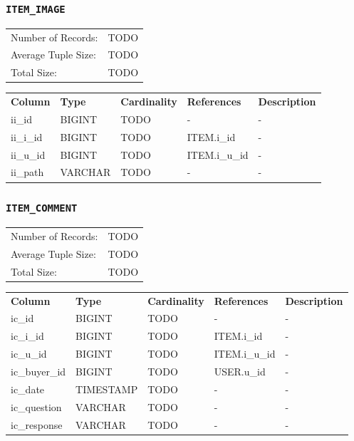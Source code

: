 \documentclass[a4paper,10pt]{article}
\begin{document}
\subsubsection{\texttt{ITEM\_IMAGE}}

\begin{tabular}{ll}
Number of Records:      & TODO \\
Average Tuple Size:     & TODO \\
Total Size:             & TODO \\
\end{tabular}

\vspace*{0.1in}

\noindent \begin{tabular*}{\textwidth}{@{\extracolsep{\fill}} lllll}
\textbf{Column} & \textbf{Type} & \textbf{Cardinality} & \textbf{References} & \textbf{Description} \\
ii\_id             & BIGINT     & TODO & -               & - \\
ii\_i\_id          & BIGINT     & TODO & ITEM.i\_id      & - \\
ii\_u\_id          & BIGINT     & TODO & ITEM.i\_u\_id   & - \\
ii\_path           & VARCHAR    & TODO & -               & - \\
\end{tabular*}

\subsubsection{\texttt{ITEM\_COMMENT}}

\begin{tabular}{ll}
Number of Records:      & TODO \\
Average Tuple Size:     & TODO \\
Total Size:             & TODO \\
\end{tabular}

\vspace*{0.1in}

\noindent \begin{tabular*}{\textwidth}{@{\extracolsep{\fill}} lllll}
\textbf{Column} & \textbf{Type} & \textbf{Cardinality} & \textbf{References} & \textbf{Description} \\
ic\_id             & BIGINT     & TODO & -               & - \\
ic\_i\_id          & BIGINT     & TODO & ITEM.i\_id      & - \\
ic\_u\_id          & BIGINT     & TODO & ITEM.i\_u\_id   & - \\
ic\_buyer\_id      & BIGINT     & TODO & USER.u\_id      & - \\
ic\_date           & TIMESTAMP  & TODO & -               & - \\
ic\_question       & VARCHAR    & TODO & -               & - \\
ic\_response       & VARCHAR    & TODO & -               & - \\
\end{tabular*}
\end{document}
